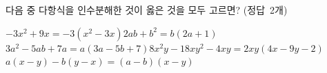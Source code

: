 다음 중 다항식을 인수분해한 것이 옳은 것을 모두 고르면? \mbox{(정답 2개)}
\begin{choicesv}{$-3x^2+9x=-3(x^2-3x)$}{$2ab+b^2=b(2a+1)$}{$3a^2-5ab+7a=a(3a-5b+7)$}{$8x^2y-18xy^2-4xy=2xy(4x-9y-2)$}{$a(x-y)-b(y-x)=(a-b)(x-y)$}\end{choicesv}

